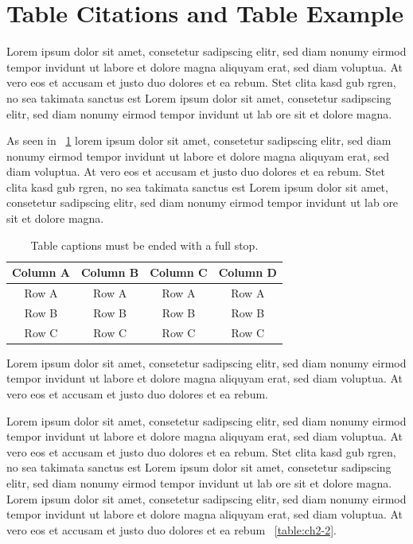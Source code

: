 \section{Table Citations and Table Example}

Lorem ipsum dolor sit amet, consetetur sadipscing elitr, sed diam nonumy eirmod tempor invidunt ut labore et dolore magna aliquyam erat, sed diam voluptua. At vero eos et accusam et justo duo dolores et ea rebum. Stet clita kasd gub rgren, no sea takimata sanctus est Lorem ipsum dolor sit amet, consetetur sadipscing elitr, sed diam nonumy eirmod tempor invidunt ut lab ore sit et dolore magna.

As seen in \tablename\ \ref{table:ch2-1} lorem ipsum dolor sit amet, consetetur sadipscing elitr, sed diam nonumy eirmod tempor invidunt ut labore et dolore magna aliquyam erat, sed diam voluptua. At vero eos et accusam et justo duo dolores et ea rebum. Stet clita kasd gub rgren, no sea takimata sanctus est Lorem ipsum dolor sit amet, consetetur sadipscing elitr, sed diam nonumy eirmod tempor invidunt ut lab ore sit et dolore magna.

\vspace{6pt} 
\begin{table}[!ht]
\centering
\setlength{\tabcolsep}{14pt}
\caption{Table captions must be ended with a full stop.}
\begin{tabular}{cccc}
\toprule\midrule
Column A & Column B & Column C & Column D \\
\midrule
Row A & Row A & Row A & Row A \\
Row B & Row B & Row B & Row B \\
Row C & Row C & Row C & Row C \\
\bottomrule
\end{tabular}
\label{table:ch2-1}
\end{table}
\vspace{-6pt} 

Lorem ipsum dolor sit amet, consetetur sadipscing elitr, sed diam nonumy eirmod tempor invidunt ut labore et dolore magna aliquyam erat, sed diam voluptua. At vero eos et accusam et justo duo dolores et ea rebum. 

Lorem ipsum dolor sit amet, consetetur sadipscing elitr, sed diam nonumy eirmod tempor invidunt ut labore et dolore magna aliquyam erat, sed diam voluptua. At vero eos et accusam et justo duo dolores et ea rebum. Stet clita kasd gub rgren, no sea takimata sanctus est Lorem ipsum dolor sit amet, consetetur sadipscing elitr, sed diam nonumy eirmod tempor invidunt ut lab ore sit et dolore magna. Lorem ipsum dolor sit amet, consetetur sadipscing elitr, sed diam nonumy eirmod tempor invidunt ut labore et dolore magna aliquyam erat, sed diam voluptua. At vero eos et accusam et justo duo dolores et ea rebum \tablename\ \ref{table:ch2-2}.

